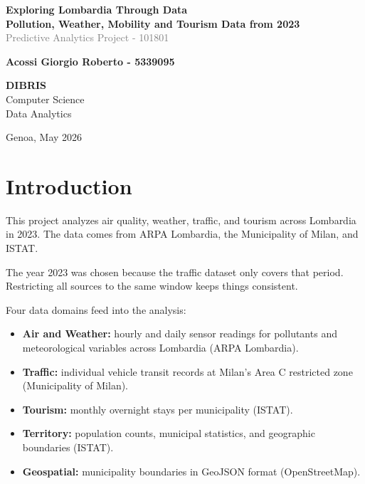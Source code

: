 \documentclass{article}
\begin{document}
	
	\begin{titlepage}
		
				
		{\Huge \textbf{Exploring Lombardia Through Data}}\\[0.4cm]
		{\Large \textbf{Pollution, Weather, Mobility and Tourism Data from 2023}}\\[0.4cm]
		{\large \textcolor{gray}{Predictive Analytics Project - 101801}}
		
		\vspace{1.5cm}
		
		{\Large \textbf{Acossi Giorgio Roberto - 5339095}}
		
		\vfill
		
		\begin{flushleft}
			{\large \textbf{DIBRIS}}\\[0.2cm]
			Computer Science\\[0.1cm]
			Data Analytics
		\end{flushleft}
		
		\vspace{2cm}
		
		Genoa, May 2026
		
	\end{titlepage}
	
	\tableofcontents
	\newpage
	
	\section{Introduction}
	
	This project analyzes air quality, weather, traffic, and tourism across Lombardia in 2023. The data comes from ARPA Lombardia, the Municipality of Milan, and ISTAT.

	The year 2023 was chosen because the traffic dataset only covers that period. Restricting all sources to the same window keeps things consistent.

	Four data domains feed into the analysis:
	\begin{itemize}
		\item \textbf{Air and Weather:} hourly and daily sensor readings for pollutants and meteorological variables across Lombardia (ARPA Lombardia).
		\item \textbf{Traffic:} individual vehicle transit records at Milan's Area C restricted zone (Municipality of Milan).
		\item \textbf{Tourism:} monthly overnight stays per municipality (ISTAT).
		\item \textbf{Territory:} population counts, municipal statistics, and geographic boundaries (ISTAT).
		\item \textbf{Geospatial:} municipality boundaries in GeoJSON format (OpenStreetMap).
	\end{itemize}
\end{document}
